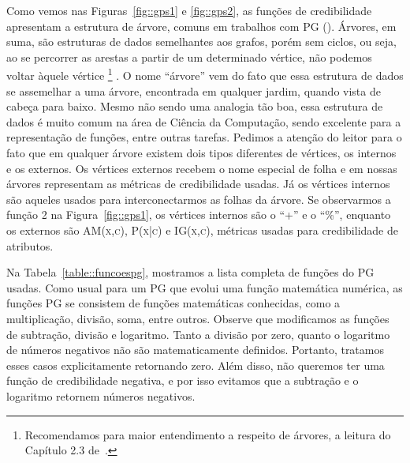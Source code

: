 Como vemos nas Figuras~\ref{fig::gps1} e \ref{fig::gps2}, as funções de credibilidade apresentam a estrutura de árvore, comuns em trabalhos com \textsc{PG} (\cite{Koza92}). 
Árvores, em suma, são estruturas de dados semelhantes aos grafos, porém sem ciclos, ou seja, ao se percorrer as arestas a partir de um determinado vértice, não podemos voltar àquele vértice
\footnote{
Recomendamos para maior entendimento a respeito de árvores, a leitura do Capítulo 2.3 de~\cite{Knuth97}.
}
.
O nome ``árvore'' vem do fato que essa estrutura de dados se assemelhar a uma árvore, encontrada em qualquer jardim, quando vista de cabeça para baixo. 
Mesmo não sendo uma analogia tão boa, essa estrutura de dados é muito comum na área de Ciência da Computação, sendo excelente para a representação de funções, entre outras tarefas.
Pedimos a atenção do leitor para o fato que em qualquer árvore existem dois tipos diferentes de vértices, os internos e os externos.
Os vértices externos recebem o nome especial de folha e em nossas árvores representam as métricas de credibilidade usadas.
Já os vértices internos são aqueles usados para interconectarmos as folhas da árvore. Se observarmos a função 2 na Figura~\ref{fig::gps1}, os vértices internos são o ``+'' e o ``\%'', enquanto os externos são \textsc{AM(x,c)}, \textsc{P(x|c)} e \textsc{IG(x,c)}, métricas usadas para credibilidade de atributos.



Na Tabela~\ref{table::funcoespg}, mostramos a lista completa de funções do \textsc{PG} usadas. 
Como usual para um \textsc{PG} que evolui uma função matemática numérica, as funções \textsc{PG} se consistem de funções matemáticas conhecidas, como a multiplicação, divisão, soma, entre outros. Observe que modificamos as funções de subtração, divisão e logaritmo.
Tanto a divisão por zero, quanto o logaritmo de números negativos não são matematicamente definidos. Portanto, tratamos esses casos explicitamente  retornando zero. Além disso, não queremos ter uma função de credibilidade negativa, e por isso evitamos que a subtração e o logaritmo retornem números negativos.

